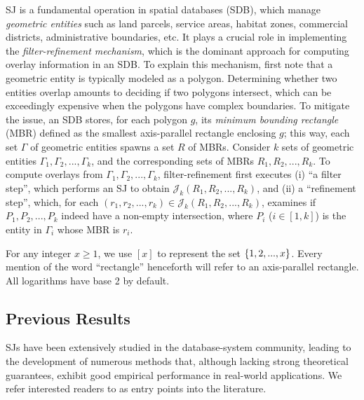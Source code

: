 \documentclass[sigconf]{acmart}
\def\vgap{\vspace{1mm}}
\def\extraspacing{\vspace{2mm} \noindent}
\def\J{\mathcal{J}}
\begin{document}
\vgap

SJ is a fundamental operation in spatial databases (SDB), which manage {\em geometric entities} such as land parcels, service areas, habitat zones, commercial districts, administrative boundaries, etc. It plays a crucial role in implementing the {\em filter-refinement mechanism}, which is the dominant approach for computing overlay information in an SDB. To explain this mechanism, first note that a geometric entity is typically modeled as a polygon. Determining whether two entities overlap amounts to deciding if two polygons intersect, which can be exceedingly expensive when the polygons have complex boundaries. To mitigate the issue, an SDB stores, for each polygon $g$, its {\em minimum bounding rectangle} (MBR) defined as the smallest axis-parallel rectangle enclosing $g$; this way, each set $\Gamma$ of geometric entities spawns a set $R$ of MBRs. Consider $k$ sets of geometric entities $\Gamma_1, \Gamma_2, ..., \Gamma_k$, and the corresponding sets of MBRs $R_1, R_2, ..., R_k$. To compute overlays from $\Gamma_1, \Gamma_2, ..., \Gamma_k$, filter-refinement first executes (i) ``a filter step'', which performs an SJ to obtain $\J_k(R_1, R_2, ..., R_k)$, and (ii) a ``refinement step'', which, for each $(r_1, r_2, ..., r_k) \in \J_k(R_1, R_2, ..., R_k)$, examines if $P_1, P_2, ..., P_k$ indeed have a non-empty intersection, where $P_i$ ($i \in [1, k]$) is the entity in $\Gamma_i$ whose MBR is $r_i$.


\extraspacing {\bf Math Conventions.} For any integer $x \ge 1$, we use $[x]$ to represent the set $\{1, 2, ..., x\}$. Every mention of the word ``rectangle'' henceforth will refer to an axis-parallel rectangle. All logarithms have base 2 by default.

\subsection{Previous Results} \label{sec:intro:prev}

SJs have been extensively studied in the database-system community, leading to the development of numerous methods that, although lacking strong theoretical guarantees, exhibit good empirical performance in real-world applications. We refer interested readers to \cite{apr+00,bks93,gcn+13,js07,ks97,lr94,lr96,mp98,mp01,mp03,pd96,pmt99} as entry points into the literature.
\end{document}
